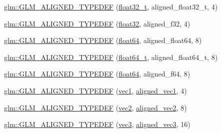 \begin{DoxyCompactItemize}
\item 
\hyperlink{group__gtx__type__aligned_gada9b0bea273d3ae0286f891533b9568f}{glm\+::\+G\+L\+M\+\_\+\+A\+L\+I\+G\+N\+E\+D\+\_\+\+T\+Y\+P\+E\+D\+EF} (\hyperlink{group__gtc__type__precision_ga642737ae3e7c434b366f2191e6944bf2}{float32\+\_\+t}, aligned\+\_\+float32\+\_\+t, 4)
\item 
\hyperlink{group__gtx__type__aligned_gadbce23b9f23d77bb3884e289a574ebd5}{glm\+::\+G\+L\+M\+\_\+\+A\+L\+I\+G\+N\+E\+D\+\_\+\+T\+Y\+P\+E\+D\+EF} (\hyperlink{group__gtc__type__precision_ga814f2f65354b6588b067cc5c67a6b340}{float32}, aligned\+\_\+f32, 4)
\item 
\hyperlink{group__gtx__type__aligned_ga75930684ff2233171c573e603f216162}{glm\+::\+G\+L\+M\+\_\+\+A\+L\+I\+G\+N\+E\+D\+\_\+\+T\+Y\+P\+E\+D\+EF} (\hyperlink{group__gtc__type__precision_gab721f828b41f46b20cf4883b50733d3b}{float64}, aligned\+\_\+float64, 8)
\item 
\hyperlink{group__gtx__type__aligned_ga6e3a2d83b131336219a0f4c7cbba2a48}{glm\+::\+G\+L\+M\+\_\+\+A\+L\+I\+G\+N\+E\+D\+\_\+\+T\+Y\+P\+E\+D\+EF} (\hyperlink{group__gtc__type__precision_gade966a3eb25ebeb16dd53c40d3fdeb46}{float64\+\_\+t}, aligned\+\_\+float64\+\_\+t, 8)
\item 
\hyperlink{group__gtx__type__aligned_gaa4deaa0dea930c393d55e7a4352b0a20}{glm\+::\+G\+L\+M\+\_\+\+A\+L\+I\+G\+N\+E\+D\+\_\+\+T\+Y\+P\+E\+D\+EF} (\hyperlink{group__gtc__type__precision_gab721f828b41f46b20cf4883b50733d3b}{float64}, aligned\+\_\+f64, 8)
\item 
\hyperlink{group__gtx__type__aligned_ga81bc497b2bfc6f80bab690c6ee28f0f9}{glm\+::\+G\+L\+M\+\_\+\+A\+L\+I\+G\+N\+E\+D\+\_\+\+T\+Y\+P\+E\+D\+EF} (\hyperlink{gtc_2vec1_8hpp_a16030dae9029ed1eab1553a2183bbb79}{vec1}, \hyperlink{group__gtc__type__aligned_ga8cf75c112dfa39264b7ef65c2ed6b3c4}{aligned\+\_\+vec1}, 4)
\item 
\hyperlink{group__gtx__type__aligned_gada3e8f783e9d4b90006695a16c39d4d4}{glm\+::\+G\+L\+M\+\_\+\+A\+L\+I\+G\+N\+E\+D\+\_\+\+T\+Y\+P\+E\+D\+EF} (\hyperlink{group__core__types_gaa1618f51db67eaa145db101d8c8431d8}{vec2}, \hyperlink{group__gtc__type__aligned_ga8f4a38f220c72d218dbdc7bc1d06a1a2}{aligned\+\_\+vec2}, 8)
\item 
\hyperlink{group__gtx__type__aligned_gab8d081fac3a38d6f55fa552f32168d32}{glm\+::\+G\+L\+M\+\_\+\+A\+L\+I\+G\+N\+E\+D\+\_\+\+T\+Y\+P\+E\+D\+EF} (\hyperlink{group__core__types_ga1c47e8b3386109bc992b6c48e91b0be7}{vec3}, \hyperlink{group__gtc__type__aligned_ga9c54536a3becfd10a44f6b1b8c4aa3d3}{aligned\+\_\+vec3}, 16)

\end{DoxyCompactItemize}
